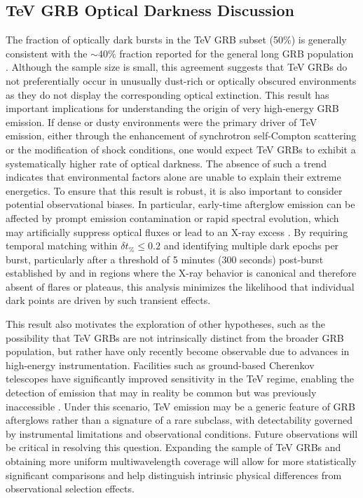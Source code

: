 \documentclass{article}
\begin{document}
\subsection{TeV GRB Optical Darkness Discussion}

The fraction of optically dark bursts in the TeV GRB subset (50\%) is generally consistent with the $\sim$40\% fraction reported for the general long GRB population \parencite{40_percent}. Although the sample size is small, this agreement suggests that TeV GRBs do not preferentially occur in unusually dust-rich or optically obscured environments as they do not display the corresponding optical extinction. This result has important implications for understanding the origin of very high-energy GRB emission. If dense or dusty environments were the primary driver of TeV emission, either through the enhancement of synchrotron self-Compton scattering or the modification of shock conditions, one would expect TeV GRBs to exhibit a systematically higher rate of optical darkness. The absence of such a trend indicates that environmental factors alone are unable to explain their extreme energetics. To ensure that this result is robust, it is also important to consider potential observational biases. In particular, early-time afterglow emission can be affected by prompt emission contamination or rapid spectral evolution, which may artificially suppress optical fluxes or lead to an X-ray excess \parencite{early_afterglow, liang, nousek}. By requiring temporal matching within $\delta t_\% \leq 0.2$ and identifying multiple dark epochs per burst, particularly after a threshold of 5 minutes (300 seconds) post-burst established by \cite{caden} and in regions where the X-ray behavior is canonical and therefore absent of flares or plateaus, this analysis minimizes the likelihood that individual dark points are driven by such transient effects.

This result also motivates the exploration of other hypotheses, such as the possibility that TeV GRBs are not intrinsically distinct from the broader GRB population, but rather have only recently become observable due to advances in high-energy instrumentation. Facilities such as ground-based Cherenkov telescopes have significantly improved sensitivity in the TeV regime, enabling the detection of emission that may in reality be common but was previously inaccessible \parencite{sitarek}. Under this scenario, TeV emission may be a generic feature of GRB afterglows rather than a signature of a rare subclass, with detectability governed by instrumental limitations and observational conditions. Future observations will be critical in resolving this question. Expanding the sample of TeV GRBs and obtaining more uniform multiwavelength coverage will allow for more statistically significant comparisons and help distinguish intrinsic physical differences from observational selection effects.
\end{document}
